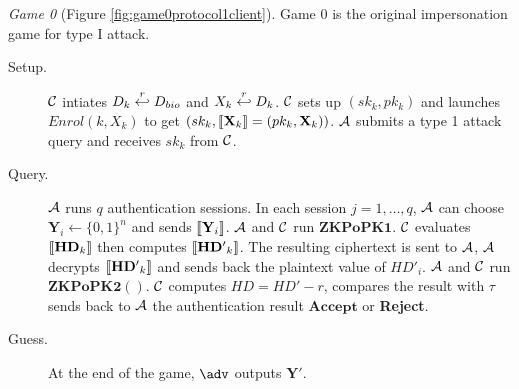 \textit{Game 0} (Figure \ref{fig:game0protocol1client}). Game 0 is the original
impersonation game for type I attack.
\begin{description}
\item [Setup.] $\mathcal{C}$ intiates $D_k \stackrel{r}{\hookleftarrow} D_{bio}$ and
  $X_k \stackrel{r}{\hookleftarrow} D_k$. $\mathcal{C}$ sets up $(sk_k, pk_k)$ and launches
  $Enrol(k, X_k)$ to get $(sk_k, \left\llbracket\mathbf{X}_{k}\right\rrbracket =(pk_k, \mathbf{X}_{k}))$.
  $\mathcal{A}$ submits a type 1 attack query and receives $sk_k$ from
  $\mathcal{C}$.
\item [Query.] $\mathcal{A}$ runs $q$ authentication sessions. In each session
  $j = 1, \dots, q$, $\mathcal{A}$ can choose $\mathbf{Y}_{i} \gets \{0,1\}^{n}$
  and sends $\left\llbracket\mathbf{Y}_{i}\right\rrbracket$. $\mathcal{A}$ and $\mathcal{C}$ run
  $\mathbf{ZKPoPK1}$. $\mathcal{C}$ evaluates $\left\llbracket\mathbf{HD}_{k}\right\rrbracket$ then
  computes $\left\llbracket\mathbf{HD'}_{k}\right\rrbracket$. The resulting ciphertext is sent to
  $\mathcal{A}$, $\mathcal{A}$ decrypts $\left\llbracket\mathbf{HD'}_{k}\right\rrbracket$ and sends back the
  plaintext value of $HD'_{i}$. $\mathcal{A}$ and $\mathcal{C}$ run
  $\mathbf{ZKPoPK2}()$. $\mathcal{C}$ computes $HD = HD' - r$, compares the result with $\tau$ sends back to $\mathcal{A}$ the authentication result $\mathbf{Accept}$ or \textbf{Reject}.
\item [Guess.] At the end of the game, $\adv$ outputs $\mathbf{Y'}$.
\end{description}

